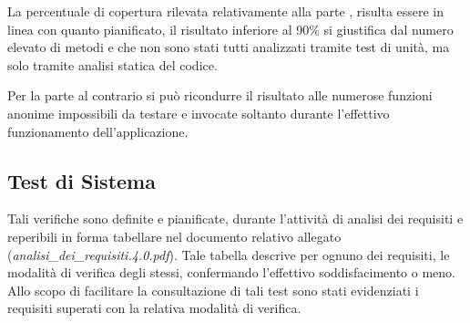 La percentuale di copertura rilevata relativamente alla parte , risulta essere in linea con quanto pianificato, il risultato inferiore al 90\% si giustifica dal numero elevato di metodi  e  che non sono stati tutti analizzati tramite test di unità, ma solo tramite analisi statica del codice.

Per la parte  al contrario si può ricondurre il risultato alle numerose funzioni anonime impossibili da testare e invocate soltanto durante l'effettivo funzionamento dell'applicazione.

\clearpage
\subsection{Test di Sistema}
Tali verifiche sono definite e pianificate, durante l'attività di analisi dei requisiti e reperibili in forma tabellare nel documento relativo allegato (\textit{analisi\_dei\_requisiti.4.0.pdf}).
Tale tabella descrive per ognuno dei requisiti, le modalità di verifica degli stessi, confermando l'effettivo soddisfacimento o meno. 
Allo scopo di facilitare la consultazione di tali test sono stati evidenziati i requisiti superati con la relativa modalità di verifica.

